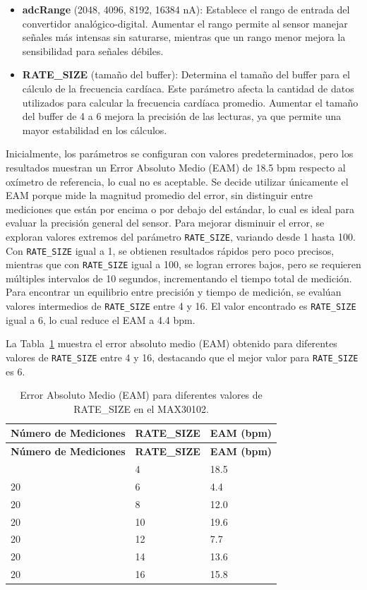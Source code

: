 \documentclass[
  12pt,
  letterpaper,
  DIV=11,
  numbers=noendperiod]{scrreport}
\begin{document}
\begin{itemize}
\item
  \textbf{adcRange} (2048, 4096, 8192, 16384 nA): Establece el rango de
  entrada del convertidor analógico-digital. Aumentar el rango permite
  al sensor manejar señales más intensas sin saturarse, mientras que un
  rango menor mejora la sensibilidad para señales débiles.
\item
  \textbf{RATE\_SIZE} (tamaño del buffer): Determina el tamaño del
  buffer para el cálculo de la frecuencia cardíaca. Este parámetro
  afecta la cantidad de datos utilizados para calcular la frecuencia
  cardíaca promedio. Aumentar el tamaño del buffer de 4 a 6 mejora la
  precisión de las lecturas, ya que permite una mayor estabilidad en los
  cálculos.
\end{itemize}

Inicialmente, los parámetros se configuran con valores predeterminados,
pero los resultados muestran un Error Absoluto Medio (EAM) de 18.5 bpm
respecto al oxímetro de referencia, lo cual no es aceptable. Se decide
utilizar únicamente el EAM porque mide la magnitud promedio del error,
sin distinguir entre mediciones que están por encima o por debajo del
estándar, lo cual es ideal para evaluar la precisión general del sensor.
Para mejorar disminuir el error, se exploran valores extremos del
parámetro \texttt{RATE\_SIZE}, variando desde 1 hasta 100. Con
\texttt{RATE\_SIZE} igual a 1, se obtienen resultados rápidos pero poco
precisos, mientras que con \texttt{RATE\_SIZE} igual a 100, se logran
errores bajos, pero se requieren múltiples intervalos de 10 segundos,
incrementando el tiempo total de medición. Para encontrar un equilibrio
entre precisión y tiempo de medición, se evalúan valores intermedios de
\texttt{RATE\_SIZE} entre 4 y 16. El valor encontrado es
\texttt{RATE\_SIZE} igual a 6, lo cual reduce el EAM a 4.4 bpm.

La Tabla~\ref{tbl-max30102} muestra el error absoluto medio (EAM)
obtenido para diferentes valores de \texttt{RATE\_SIZE} entre 4 y 16,
destacando que el mejor valor para \texttt{RATE\_SIZE} es 6.

\hypertarget{tbl-max30102}{}
\begin{longtable}[]{@{}lll@{}}
\caption{\label{tbl-max30102}Error Absoluto Medio (EAM) para diferentes
valores de RATE\_SIZE en el MAX30102.}\tabularnewline
\toprule\noalign{}
\textbf{Número de Mediciones} & \textbf{RATE\_SIZE} & \textbf{EAM
(bpm)} \\
\midrule\noalign{}
\endfirsthead
\toprule\noalign{}
\textbf{Número de Mediciones} & \textbf{RATE\_SIZE} & \textbf{EAM
(bpm)} \\
\midrule\noalign{}
\endhead
\bottomrule\noalign{}
\endlastfoot
20 & 4 & 18.5 \\
20 & 6 & 4.4 \\
20 & 8 & 12.0 \\
20 & 10 & 19.6 \\
20 & 12 & 7.7 \\
20 & 14 & 13.6 \\
20 & 16 & 15.8 \\
\end{longtable}
\end{document}
